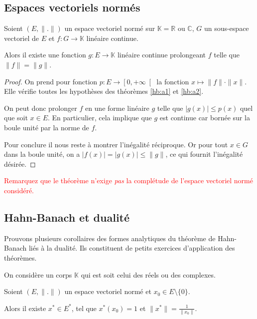 \subsection{Espaces vectoriels normés}

\begin{thm}\label{hb:a3}
  Soient $(E, \|.\|)$ un espace vectoriel normé sur $\mathbb{K}
  =\mathbb{R}$ ou $\mathbb{C}$, $G$ un sous-espace vectoriel
  de $E$ et $f: G\to\mathbb{K}$ linéaire continue.

  Alors il existe une fonction $g:E\to\mathbb{K}$ linéaire
  continue prolongeant $f$ telle que $\|f\| = \|g\|$.
\end{thm}

\begin{proof}
  On prend pour fonction $p: E\to\left[0, +\infty\right[$ la fonction
  $x\mapsto \|f\|\cdot\|x\|$. Elle vérifie toutes les hypothèses
  des théorèmes \ref{hb:a1} et \ref{hb:a2}.

  On peut donc prolonger $f$ en une forme linéaire $g$ telle que
  $|g(x)|\leq p(x)$ quel que soit $x\in E$. En particulier, cela
  implique que $g$ est continue car bornée sur la boule unité
  par la norme de $f$.

  Pour conclure il nous reste à montrer l'inégalité réciproque.
  Or pour tout $x\in G$ dans la boule unité, on a
  $|f(x)| = |g(x)|\leq \|g\|$, ce qui fournit l'inégalité
  désirée.
\end{proof}

\begin{rem}
  \textcolor{red}{
  Remarquez que le théorème n'exige \emph{pas} la complétude
  de l'espace vectoriel normé considéré.
}
\end{rem}


\subsection{Hahn-Banach et dualité}
Prouvons plusieurs corollaires des formes analytiques
du théorème de Hahn-Banach liés à la dualité.  Ils
constituent de petits exercices d'application des
théorèmes.

On considère un corps $\mathbb{K}$ qui est soit
celui des réels ou des complexes.

\begin{cor}\label{hb:a:cor1}
  Soient $(E, \|.\|)$ un espace vectoriel normé et
  $x_0\in E\setminus\{0\}$.

  Alors il existe $x^*\in E^*$, tel que $x^*(x_0)=1$
  et $\|x^*\|= \frac{1}{\|x_0\|}$.
\end{cor}

